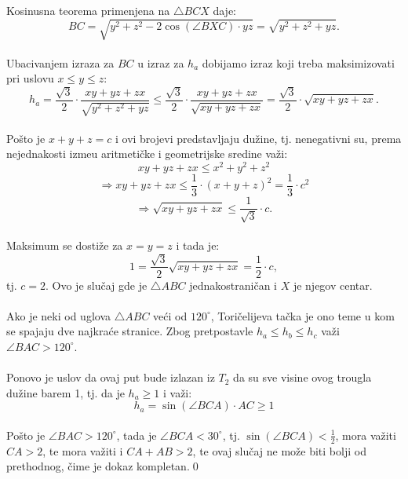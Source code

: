 \documentclass[11pt]{article}
\begin{document}
\indent Kosinusna teorema primenjena na $\bigtriangleup BCX$ daje:
\\
$$BC=\sqrt{y^2+z^2-2\cos{(\angle BXC)}\cdot yz}=\sqrt{y^2+z^2+yz}.$$
\\
\indent Ubacivanjem izraza za $BC$ u izraz za $h_a$ dobijamo izraz koji treba maksimizovati  pri uslovu $x\leqslant y\leqslant z$:
$$h_a=\frac{\sqrt3}{2}\cdot \frac{xy+yz+zx}{\sqrt{y^2+z^2+yz}}\leqslant \frac{\sqrt3}{2}\cdot \frac{xy+yz+zx}{\sqrt{xy+yz+zx}}=\frac{\sqrt3}{2}\cdot \sqrt{xy+yz+zx}.$$
\\
\indent Po\v sto je $x+y+z=c$ i ovi brojevi predstavljaju du\v zine, tj. nenegativni su, prema nejednakosti izme\dj u aritmeti\v cke i geometrijske sredine va\v zi:
$$xy+yz+zx\leqslant x^2+y^2+z^2$$
$$\Longrightarrow xy+yz+zx\leqslant \frac{1}{3}\cdot (x+y+z)^2=\frac{1}{3}\cdot c^2$$
$$\Longrightarrow \sqrt{xy+yz+zx}\leqslant \frac{1}{\sqrt3}\cdot c.$$
\\
\indent Maksimum se dosti\v ze za $x=y=z$ i tada je:
$$1=\frac{\sqrt3}{2}\sqrt{xy+yz+zx}=\frac{1}{2}\cdot c,$$
tj. $c=2$. Ovo je slu\v caj gde je $\bigtriangleup ABC$ jednakostrani\v can i $X$ je njegov centar.
\\
\\
\indent Ako je neki od uglova $\bigtriangleup ABC$ ve\' ci od $120^\circ$, Tori\v celijeva ta\v cka je ono teme u kom se spajaju dve najkra\' ce stranice. Zbog pretpostavle $h_a\leqslant h_b\leqslant h_c$ va\v zi $\angle BAC>120^\circ$.
\\
\\
\indent Ponovo je uslov da ovaj put bude izlazan iz $T_2$ da su sve visine ovog trougla du\v zine barem 1, tj. da je $h_a\geqslant 1$ i va\v zi:
$$h_a=\sin{(\angle BCA)}\cdot AC\geqslant 1$$
\\
\indent Po\v sto je $\angle BAC>120^\circ$, tada je $\angle BCA<30^\circ$, tj. $\sin(\angle BCA)<\frac{1}{2}$, mora va\v ziti $CA>2$, te mora va\v ziti i $CA+AB>2$, te ovaj slu\v caj ne mo\v ze biti bolji od prethodnog, \v cime je dokaz kompletan.\qed
\\
\end{document}
